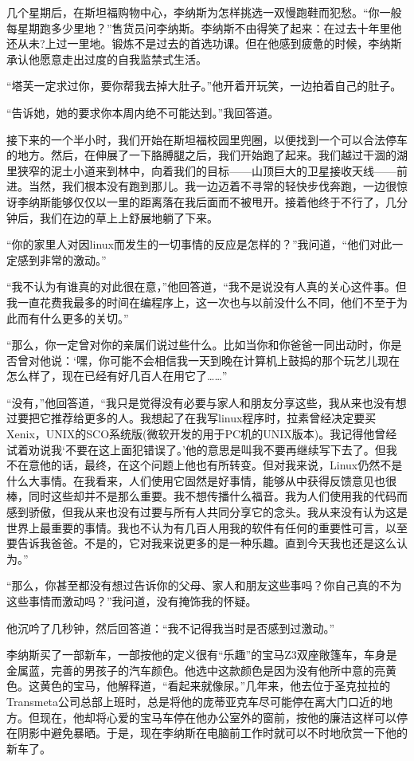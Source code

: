 几个星期后，在斯坦福购物中心，李纳斯为怎样挑选一双慢跑鞋而犯愁。“你一般每星期跑多少里地？”售货员问李纳斯。李纳斯不由得笑了起来：在过去十年里他还从未?上过一里地。锻炼不是过去的首选功课。但在他感到疲惫的时候，李纳斯承认他愿意走出过度的自我监禁式生活。

“塔芙一定求过你，要你帮我去掉大肚子。”他开着开玩笑，一边拍着自己的肚子。

“告诉她，她的要求你本周内绝不可能达到。”我回答道。

接下来的一个半小时，我们开始在斯坦福校园里兜圈，以便找到一个可以合法停车的地方。然后，在伸展了一下胳膊腿之后，我们开始跑了起来。我们越过干涸的湖里狭窄的泥土小道来到林中，向着我们的目标——山顶巨大的卫星接收天线——前进。当然，我们根本没有跑到那儿。我一边迈着不寻常的轻快步伐奔跑，一边很惊讶李纳斯能够仅仅以一里的距离落在我后面而不被甩开。接着他终于不行了，几分钟后，我们在边的草上上舒展地躺了下来。

“你的家里人对因linux而发生的一切事情的反应是怎样的？”我问道，“他们对此一定感到非常的激动。”

“我不认为有谁真的对此很在意，”他回答道，“我不是说没有人真的关心这件事。但我一直花费我最多的时间在编程序上，这一次也与以前没什么不同，他们不至于为此而有什么更多的关切。”

“那么，你一定曾对你的亲属们说过些什么。比如当你和你爸爸一同出动时，你是否曾对他说：‘嘿，你可能不会相信我一天到晚在计算机上鼓捣的那个玩艺儿现在怎么样了，现在已经有好几百人在用它了……”

“没有，”他回答道，“我只是觉得没有必要与家人和朋友分享这些，我从来也没有想过要把它推荐给更多的人。我想起了在我写linux程序时，拉素曾经决定要买Xenix，UNIX的SCO系统版(微软开发的用于PC机的UNIX版本)。我记得他曾经试着劝说我‘不要在这上面犯错误了。’他的意思是叫我不要再继续写下去了。但我不在意他的话，最终，在这个问题上他也有所转变。但对我来说，Linux仍然不是什么大事情。在我看来，人们使用它固然是好事情，能够从中获得反馈意见也很棒，同时这些却并不是那么重要。我不想传播什么福音。我为人们使用我的代码而感到骄傲，但我从来也没有过要与所有人共同分享它的念头。我从来没有认为这是世界上最重要的事情。我也不认为有几百人用我的软件有任何的重要性可言，以至要告诉我爸爸。不是的，它对我来说更多的是一种乐趣。直到今天我也还是这么认为。”

“那么，你甚至都没有想过告诉你的父母、家人和朋友这些事吗？你自己真的不为这些事情而激动吗？”我问道，没有掩饰我的怀疑。

他沉吟了几秒钟，然后回答道：“我不记得我当时是否感到过激动。”

李纳斯买了一部新车，一部按他的定义很有“乐趣”的宝马Z3双座敞篷车，车身是金属蓝，完善的男孩子的汽车颜色。他选中这款颜色是因为没有他所中意的亮黄色。这黄色的宝马，他解释道，“看起来就像尿。”几年来，他去位于圣克拉拉的Transmeta公司总部上班时，总是将他的庞蒂亚克车尽可能停在离大门口近的地方。但现在，他却将心爱的宝马车停在他办公室外的窗前，按他的廉洁这样可以停在阴影中避免暴晒。于是，现在李纳斯在电脑前工作时就可以不时地欣赏一下他的新车了。


